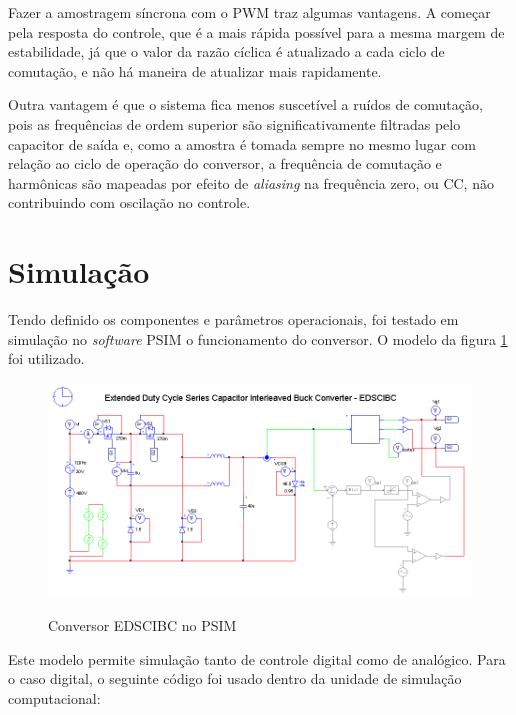 \documentclass[
        12pt,
        openany, %
        oneside, %
        a4paper,			
        english,			
        brazil
        ]{abntbibufjf}
\begin{document}
Fazer a amostragem síncrona com o PWM traz algumas vantagens. A começar pela resposta do controle, que é a mais rápida possível para a mesma margem de estabilidade, já que o valor da razão cíclica é atualizado a cada ciclo de comutação, e não há maneira de atualizar mais rapidamente.

Outra vantagem é que o sistema fica menos suscetível a ruídos de comutação, pois as frequências de ordem superior são significativamente filtradas pelo capacitor de saída e, como a amostra é tomada sempre no mesmo lugar com relação ao ciclo de operação do conversor, a frequência de comutação e harmônicas são mapeadas por efeito de \textit{aliasing} na frequência zero, ou CC, não contribuindo com oscilação no controle.



\section{Simulação}

Tendo definido os componentes e parâmetros operacionais, foi testado em simulação no \textit{software} PSIM o funcionamento do conversor. O modelo da figura \ref{pc_model} foi utilizado.

\begin{figure}[h]
	\centering
	\caption{Conversor EDSCIBC no PSIM}
	\includegraphics[scale=.7]{../ESQUEMAS/Ctrl_egibc_2.PNG}\\
	\label{pc_model}
\end{figure}

Este modelo permite simulação tanto de controle digital como de analógico. Para o caso digital, o seguinte código foi usado dentro da unidade de simulação computacional:
\end{document}

